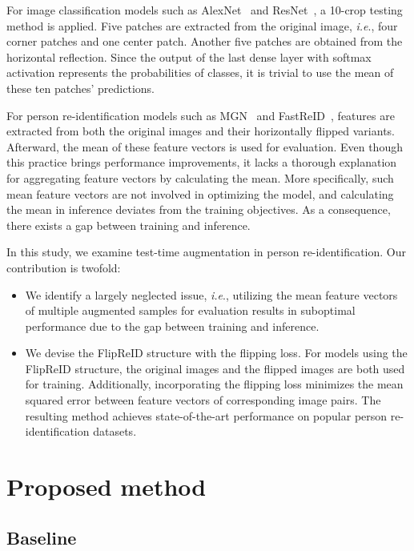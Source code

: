 \documentclass{article}
\def\onedot{.}
\def\ie{\emph{i.e}\onedot} \def\Ie{\emph{I.e}\onedot}
\begin{document}
For image classification models such as AlexNet~\cite{krizhevsky2012imagenet} and ResNet~\cite{he2016deep}, a 10-crop testing method is applied.
Five patches are extracted from the original image, \ie, four corner patches and one center patch.
Another five patches are obtained from the horizontal reflection.
Since the output of the last dense layer with softmax activation represents the probabilities of classes, it is trivial to use the mean of these ten patches' predictions.

For person re-identification models such as MGN~\cite{wang2018MGN} and FastReID~\cite{he2020fastreid}, features are extracted from both the original images and their horizontally flipped variants.
Afterward, the mean of these feature vectors is used for evaluation.
Even though this practice brings performance improvements, it lacks a thorough explanation for aggregating feature vectors by calculating the mean.
More specifically, such mean feature vectors are not involved in optimizing the model, and calculating the mean in inference deviates from the training objectives.
As a consequence, there exists a gap between training and inference.

In this study, we examine test-time augmentation in person re-identification.
Our contribution is twofold:
\begin{itemize}
\itemsep0em
\item
We identify a largely neglected issue, \ie, utilizing the mean feature vectors of multiple augmented samples for evaluation results in suboptimal performance due to the gap between training and inference.
\item
We devise the FlipReID structure with the flipping loss.
For models using the FlipReID structure, the original images and the flipped images are both used for training.
Additionally, incorporating the flipping loss minimizes the mean squared error between feature vectors of corresponding image pairs.
The resulting method achieves state-of-the-art performance on popular person re-identification datasets.
\end{itemize}

\section{Proposed method}

\subsection{Baseline}
\end{document}
